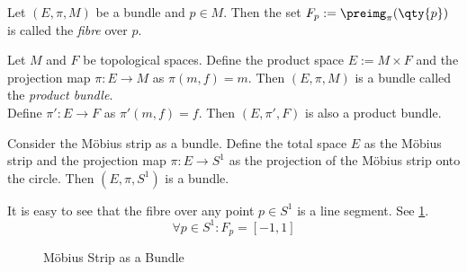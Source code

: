 \begin{definition}[Fibre]\label{def:fibre}
	Let \((E, \pi, M)\) be a bundle and \(p \in M\). Then the set \(F_p := \preimg_{\pi}(\qty{p})\) is called the \emph{fibre} over \(p\).
\end{definition}

\begin{example}
	Let \(M\) and \(F\) be topological spaces. Define the product space \(E := M \times F\) and the projection map \(\pi: E \to M\) as \(\pi(m, f) = m\). Then \((E, \pi, M)\) is a bundle called the \emph{product bundle}. \\
	Define \(\pi': E \to F\) as \(\pi'(m, f) = f\). Then \((E, \pi', F)\) is also a product bundle.
\end{example}

\begin{example}
	Consider the M\"obius strip as a bundle. Define the total space \(E\) as the M\"obius strip and the projection map \(\pi: E \to S^1\) as the projection of the M\"obius strip onto the circle. Then \((E, \pi, S^1)\) is a bundle.

	It is easy to see that the fibre over any point \(p \in S^1\) is a line segment. See \cref{fig:moebius-strip-bundle}.
	\begin{equation}
		\forall p \in S^1: F_p = [-1, 1]
	\end{equation}
	\begin{figure}[H]
		\centering
		\caption{M\"obius Strip as a Bundle}
		\label{fig:moebius-strip-bundle}
	\end{figure}
\end{example}


